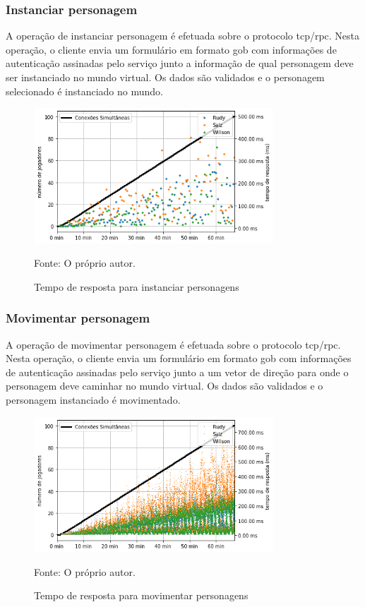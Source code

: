 \subsubsection{Instanciar personagem}

A operação de instanciar personagem é efetuada sobre o protocolo \ac{tcp}/\ac{rpc}.
%
Nesta operação, o cliente envia um formulário em formato \ac{gob} com informações de autenticação assinadas pelo serviço junto a informação de qual personagem deve ser instanciado no mundo virtual.
%
Os dados são validados e o personagem selecionado é instanciado no mundo.

\begin{figure}[htb!]
  \caption{Tempo de resposta para instanciar personagens}
  \label{fig:spawn_character_request_time}
  \includegraphics[width=0.8\textwidth]{figuras/analise/rt/spawn_character_request_time.png}
  \centering

  Fonte: O próprio autor.
\end{figure}


\subsubsection{Movimentar personagem}

A operação de movimentar personagem é efetuada sobre o protocolo \ac{tcp}/\ac{rpc}.
%
Nesta operação, o cliente envia um formulário em formato \ac{gob} com informações de autenticação assinadas pelo serviço junto a um vetor de direção para onde o personagem deve caminhar no mundo virtual.
%
Os dados são validados e o personagem instanciado é movimentado.

\begin{figure}[htb!]
  \caption{Tempo de resposta para movimentar personagens}
  \label{fig:move_character_request_time}
  \includegraphics[width=0.8\textwidth]{figuras/analise/rt/move_character_request_time}
  \centering

  Fonte: O próprio autor.
\end{figure}

